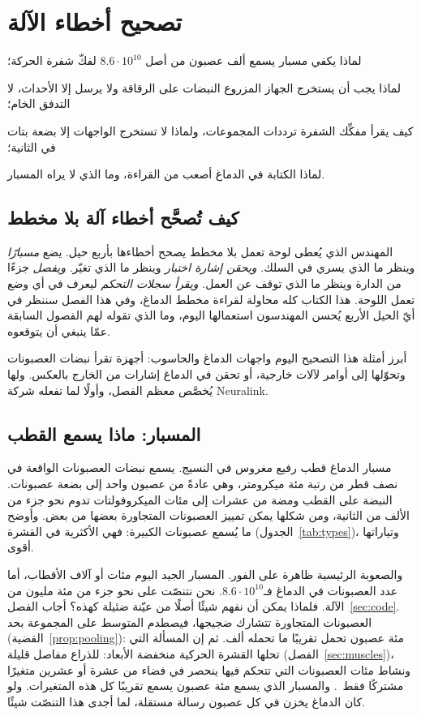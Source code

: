 \chapter{تصحيح أخطاء الآلة}
\label{sec:debugging}
\begin{chaptergoals}
\item لماذا يكفي مسبار يسمع ألف عصبون من أصل $8.6\cdot10^{10}$ لفكّ شفرة الحركة؛
\item لماذا يجب أن يستخرج الجهاز المزروع النبضات على الرقاقة ولا يرسل إلا الأحداث، لا التدفق الخام؛
\item كيف يقرأ مفكِّك الشفرة ترددات المجموعات، ولماذا لا تستخرج الواجهات إلا بضعة بتات في الثانية؛
\item لماذا الكتابة في الدماغ أصعب من القراءة، وما الذي لا يراه المسبار.
\end{chaptergoals}

\section{كيف تُصحَّح أخطاء آلة بلا مخطط}

المهندس الذي يُعطى لوحة تعمل بلا مخطط يصحح أخطاءها بأربع حيل. يضع \emph{مسبارًا} وينظر ما الذي يسري في السلك. \emph{ويحقن إشارة اختبار} وينظر ما الذي تغيّر. \emph{ويفصل} جزءًا من الدارة وينظر ما الذي توقف عن العمل. \emph{ويقرأ سجلات التحكم} ليعرف في أي وضع تعمل اللوحة. هذا الكتاب كله محاولة لقراءة مخطط الدماغ، وفي هذا الفصل سننظر في أيّ الحيل الأربع يُحسن المهندسون استعمالها اليوم، وما الذي تقوله لهم الفصول السابقة عمّا ينبغي أن يتوقعوه.

أبرز أمثلة هذا التصحيح اليوم واجهات الدماغ والحاسوب: أجهزة تقرأ نبضات العصبونات وتحوّلها إلى أوامر لآلات خارجية، أو تحقن في الدماغ إشارات من الخارج بالعكس. ولها يُخصَّص معظم الفصل، وأولًا لما تفعله شركة \foreignlanguage{english}{Neuralink}.

\section{المسبار: ماذا يسمع القطب}

مسبار الدماغ قطب رفيع مغروس في النسيج. يسمع نبضات العصبونات الواقعة في نصف قطر من رتبة مئة ميكرومتر، وهي عادةً من عصبون واحد إلى بضعة عصبونات. النبضة على القطب ومضة من عشرات إلى مئات الميكروفولتات تدوم نحو جزء من الألف من الثانية، ومن شكلها يمكن تمييز العصبونات المتجاورة بعضها من بعض. وأوضح ما يُسمع عصبونات  الكبيرة: فهي الأكثرية في القشرة (الجدول~\ref{tab:types})، وتياراتها أقوى.

والصعوبة الرئيسية ظاهرة على الفور. المسبار الجيد اليوم مئات أو آلاف الأقطاب، أما عدد العصبونات في الدماغ فـ$8.6\cdot10^{10}$. نحن نتنصّت على نحو جزء من مئة مليون من الآلة. فلماذا يمكن أن نفهم شيئًا أصلًا من عيّنة ضئيلة كهذه؟ أجاب الفصل~\ref{sec:code}. العصبونات المتجاورة تتشارك ضجيجها، فيصطدم المتوسط على المجموعة بحد (القضية~\ref{prop:pooling}): مئة عصبون تحمل تقريبًا ما تحمله ألف. ثم إن المسألة التي تحلها القشرة الحركية منخفضة الأبعاد: للذراع مفاصل قليلة (الفصل~\ref{sec:muscles})، ونشاط مئات العصبونات التي تتحكم فيها ينحصر في فضاء من عشرة أو عشرين متغيرًا مشتركًا فقط~\cite{Gallego2017}. والمسبار الذي يسمع مئة عصبون يسمع تقريبًا كل هذه المتغيرات. ولو كان الدماغ يخزن في كل عصبون رسالة مستقلة، لما أجدى هذا التنصّت شيئًا.

